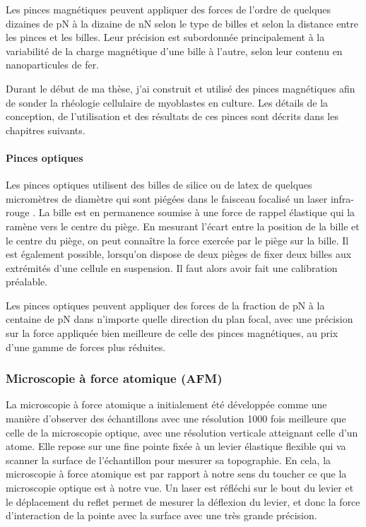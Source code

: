 \documentclass{report}
\begin{document}
Les pinces magnétiques peuvent appliquer des forces de l'ordre de quelques dizaines de pN à la dizaine de nN selon le type de billes et selon la distance entre les pinces et les billes. 
Leur précision est subordonnée principalement à la variabilité de la charge magnétique d'une bille à l'autre, selon leur contenu en nanoparticules de fer. 


Durant le début de ma thèse, j'ai construit et utilisé des pinces magnétiques afin de sonder la rhéologie cellulaire de myoblastes en culture. Les détails de la conception, de l'utilisation et des résultats de ces pinces sont décrits dans les chapitres suivants. 


\paragraph{Pinces optiques}

Les pinces optiques utilisent des billes de silice ou de latex de quelques micromètres de diamètre qui sont piégées dans le faisceau focalisé un laser infra-rouge \cite{neuman}.
La bille est en permanence soumise à une force de rappel élastique qui la ramène vers le centre du piège. 
En mesurant l'écart entre la position de la bille et le centre du piège, on peut connaître la force exercée par le piège sur la bille. 
Il est également possible, lorsqu'on dispose de deux pièges de fixer deux billes aux extrémités d'une cellule en suspension. Il faut alors avoir fait une calibration préalable. 

Les pinces optiques peuvent appliquer des forces de la fraction de pN  à la centaine de pN dans n'importe quelle direction du plan focal, avec une précision sur la force appliquée bien meilleure de celle des pinces magnétiques, au prix d'une gamme de forces plus réduites. 

\subsubsection{Microscopie à force atomique (AFM)}

La microscopie à force atomique a initialement été développée comme une manière d'observer des échantillons avec une résolution 1000 fois meilleure que celle de la microscopie optique, avec une résolution verticale atteignant celle d'un atome. 
Elle repose sur une fine pointe fixée à un levier élastique flexible qui va scanner la surface de l'échantillon pour mesurer sa topographie. En cela, la microscopie à force atomique est par rapport à notre sens du toucher ce que la microscopie optique est à notre vue. Un laser est réfléchi sur le bout du levier et le déplacement du reflet permet de mesurer la déflexion du levier, et donc la force d'interaction de la pointe avec la surface avec une très grande précision. 
\end{document}
